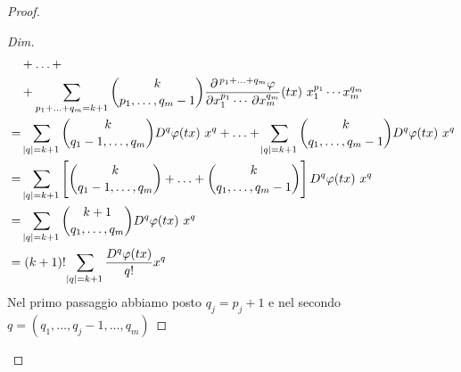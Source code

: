 \begin{proof}
\begin{proof}[Dim]
\begin{align*}
			& \quad + \ldots + \\
			& \quad + \sum_{p_1 + \ldots + q_m = k + 1} \binom{k}{p_1, \ldots, q_m - 1} \dfrac{\partial^{\,p_1 + \ldots + q_m}{\varphi}}{\partial{x_1^{p_1}} \cdots \, \partial{x_m^{q_m}}} (tx)  \ x_1^{p_1} \cdots x_m^{q_m} \\
			& = \sum_{\abs{q} = k + 1} \binom{k}{q_1 - 1, \ldots, q_m} D^q \varphi (tx)  \ x^q + \ldots + \sum_{\abs{q} = k + 1} \binom{k}{q_1, \ldots, q_m - 1} D^q \varphi (tx)  \ x^q \\
			& = \sum_{\abs{q} = k + 1} \left[\binom{k}{q_1 - 1, \ldots, q_m} + \ldots + \binom{k}{q_1, \ldots, q_m - 1}\right] D^q \varphi (tx)  \ x^q \\
			& = \sum_{\abs{q} = k + 1} \binom{k + 1}{q_1, \ldots, q_m} D^q \varphi (tx)  \ x^q \\
			& = (k + 1)!  \sum_{\abs{q} = k + 1} \frac{D^q \varphi(tx)}{q!} x^q
		\end{align*}
		Nel primo passaggio abbiamo posto $ q_j = p_j + 1 $ e nel secondo $ q = (q_1, \ldots, q_j - 1, \ldots, q_m) $		
	\end{proof}
	\phantom{\qedhere}
\end{proof}

\iffalse
Verifichiamolo per semplicità nel caso $ m = 2 $ in cui la formula diventa 
\[
\psi^{(k)}(t) = \sum_{i = 0}^{k} \binom{k}{i} \frac{\partial^k \varphi}{\partial x^i \partial y^{k - i}}(tx, ty) x^i y^{k - i}
\]
infatti
\begin{align*}
\psi^{(k + 1)}(t) & = \sum_{i = 0}^{k} \binom{k}{i} \left[\frac{\partial^{k + 1} \varphi}{\partial x^{i + 1} \partial y^{k - i}}(tx, ty) \cdot x + \frac{\partial^{k + 1} \varphi}{\partial x^{i} \partial y^{k - i + 1}}(tx, ty) \cdot y \right] x^i y^{k - i} \\
& = \sum_{i = 0}^{k}  \binom{k}{i} \frac{\partial^{k + 1} \varphi}{\partial x^{i + 1} \partial y^{k - i}}(tx, ty) x^{i + 1} y^{k - i} + \sum_{i = 0}^{k} \binom{k}{i} \frac{\partial^{k + 1} \varphi}{\partial x^{i} \partial y^{k - i + 1}}(tx, ty) \cdot x^i y^{k -i + 1} \\
(j = i + 1) & = \sum_{j = 1}^{k + 1} \binom{k}{j - 1} \frac{\partial^{k + 1} \varphi}{\partial x^{j} \partial y^{k + 1 - j}}(tx, ty) x^{j} y^{k + 1 - j} + \sum_{i = 0}^{k} \binom{k}{i} \frac{\partial^{k + 1} \varphi}{\partial x^{i} \partial y^{k + 1 - i}}(tx, ty) \cdot x^i y^{k + 1 - i} \\
& = \sum_{j = 0}^{k + 1} \binom{k}{j - 1} \frac{\partial^{k + 1} \varphi}{\partial x^{j} \partial y^{k + 1 - j}}(tx, ty) x^{j} y^{k + 1 - j} + \sum_{i = 0}^{k + 1} \binom{k}{i} \frac{\partial^{k + 1} \varphi}{\partial x^{i} \partial y^{k + 1 - i}}(tx, ty) \cdot x^i y^{k + 1 - i} \\
& = \sum_{i = 0}^{k + 1} \left[\binom{k}{i - 1} + \binom{k}{i}\right] \frac{\partial^{k + 1} \varphi}{\partial x^{i} \partial y^{k + 1 - i}}(tx, ty) x^{i} y^{k + 1 - i} \\
& = \sum_{i = 0}^{k + 1} \binom{k + 1}{i} \frac{\partial^{k + 1} \varphi}{\partial x^{i} \partial y^{k + 1 - i}}(tx, ty) x^{i} y^{k + 1 - i} \\
\end{align*}
\fi

